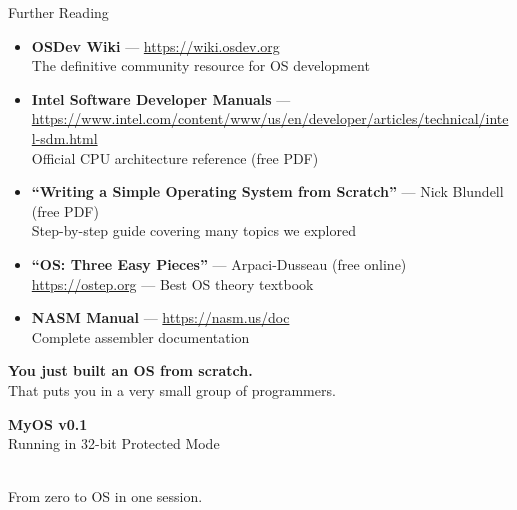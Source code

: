 \documentclass[aspectratio=169]{beamer}
\begin{document}
\begin{frame}{Further Reading}
  \begin{itemize}
    \item \textbf{OSDev Wiki} --- \url{https://wiki.osdev.org} \\
      The definitive community resource for OS development
    \item \textbf{Intel Software Developer Manuals} --- \url{https://www.intel.com/content/www/us/en/developer/articles/technical/intel-sdm.html}\\
      Official CPU architecture reference (free PDF)
    \item \textbf{``Writing a Simple Operating System from Scratch''} --- Nick Blundell (free PDF)\\
      Step-by-step guide covering many topics we explored
    \item \textbf{``OS: Three Easy Pieces''} --- Arpaci-Dusseau (free online)\\
      \url{https://ostep.org} --- Best OS theory textbook
    \item \textbf{NASM Manual} --- \url{https://nasm.us/doc}\\
      Complete assembler documentation
  \end{itemize}
  \vspace{8pt}
  \begin{center}
    \Large \textbf{You just built an OS from scratch.}\\[4pt]
    \normalsize That puts you in a very small group of programmers.
  \end{center}
\end{frame}

\begin{frame}[plain]
  \begin{center}
    \vspace{1cm}
    {\Huge \textbf{MyOS v0.1}}\\[0.5cm]
    {\large Running in 32-bit Protected Mode}\\[1cm]
    \\[0.8cm]
    {\large From zero to OS in one session.}
  \end{center}
\end{frame}
\end{document}
